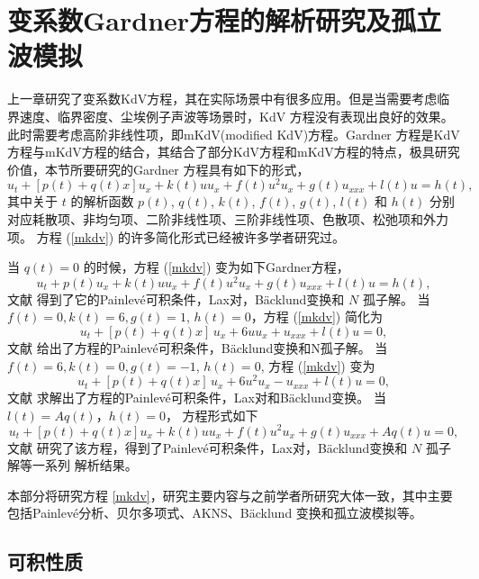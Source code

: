 ﻿\chapter{变系数Gardner方程的解析研究及孤立波模拟}
上一章研究了变系数KdV方程，其在实际场景中有很多应用。但是当需要考虑临界速度、临界密度、尘埃例子声波等场景时，KdV 方程没有表现出良好的效果。此时需要考虑高阶非线性项，即mKdV(modified KdV)方程。Gardner 方程是KdV方程与mKdV方程的结合，其结合了部分KdV方程和mKdV方程的特点，极具研究价值，本节所要研究的Gardner 方程具有如下的形式，
\begin{equation}
u_t+[p(t)+q(t) x]u_x +k(t)u u_x+ f(t)u^2 u_x  +g(t)u_{xxx}+l(t)u=h(t) , \label{mkdv}
\end{equation}
其中关于 $t$ 的解析函数 $p(t)$, $q(t)$, $k(t )$, $f(t )$, $g(t)$, $l(t)$ 和
$h(t )$ 分别对应耗散项、非均匀项、二阶非线性项、三阶非线性项、色散项、松弛项和外力项。
方程 (\ref{mkdv}) 的许多简化形式已经被许多学者研究过。

当 $ q(t)=0$ 的时候，方程 (\ref{mkdv}) 变为如下Gardner方程，
\begin{equation}
u_t+p(t)u_x +k(t)u u_x+ f(t)u^2 u_x +g(t)u_{xxx}+l(t)u=h(t), \label{eq2}
\end{equation}
文献 \cite{mkdv-4,mkdv-5} 得到了它的Painlev\'{e}可积条件，Lax对，B\"{a}cklund变换和 $N$ 孤子解。
当 $ f(t)=0, k(t)=6, g(t)=1$, $h(t)=0$，方程 (\ref{mkdv}) 简化为
\begin{equation}
u_t+[p(t)+q(t)x]\,u_x  +6 u u_x+u_{xxx}+l(t)u=0, \label{eq3}
\end{equation}
文献 \cite{mkdv-6} 给出了方程的Painlev\'{e}可积条件，B\"{a}cklund变换和N孤子解。
当 $ f(t)=6, k(t)=0, g(t)=-1$, $h(t)=0$, 方程 (\ref{mkdv}) 变为
\begin{equation}
u_t+[p(t)+q(t)x]\,u_x  +6 u^2 u_x-u_{xxx}+l(t)u=0, \label{eq3-1}
\end{equation}
文献 \cite{mkdv-8} 求解出了方程的Painlev\'{e}可积条件，Lax对和B\"{a}cklund变换。
当  $l(t)=A q(t)$，$h(t)=0$， 方程形式如下
\begin{equation}
u_t+[p(t)+q(t)x]u_x +k(t)u u_x+ f(t)u^2 u_x +g(t)u_{xxx}+A q(t)u=0, \label{eq4}
\end{equation}
文献 \cite{mkdv-9} 研究了该方程，得到了Painlev\'{e}可积条件，Lax对，B\"{a}cklund变换和 $N$ 孤子解等一系列
解析结果。

本部分将研究方程 \ref{mkdv}，研究主要内容与之前学者所研究大体一致，其中主要包括Painlev\'{e}分析、贝尔多项式、AKNS、B\"{a}cklund 变换和孤立波模拟等。

\section{可积性质}
